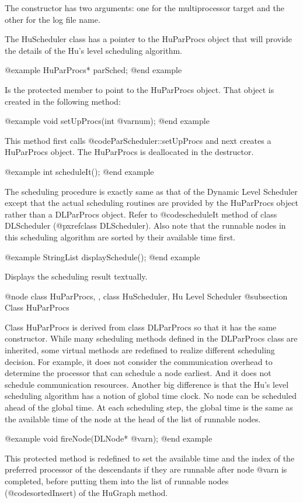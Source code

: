 The constructor has two arguments: one for the multiprocessor target and the
other for the log file name.

The HuScheduler class has a pointer to the HuParProcs object that will
provide the details of the Hu's level scheduling algorithm.

@example
HuParProcs* parSched;
@end example

Is the protected member to point to the HuParProcs object.
That object is created in the following method:

@example
void setUpProcs(int @var{num});
@end example

This method first calls @code{ParScheduler::setUpProcs} and next creates
a HuParProcs object. The HuParProcs is deallocated in the destructor.

@example
int scheduleIt();
@end example

The scheduling procedure is exactly same as that of the Dynamic Level 
Scheduler except that the actual scheduling routines are provided
by the HuParProcs object rather than a DLParProcs object. 
Refer to @code{scheduleIt} method of class DLScheduler
(@pxref{class DLScheduler}). Also note that the runnable nodes in
this scheduling algorithm are sorted by their available time first.

@example
StringList displaySchedule();
@end example

Displays the scheduling result textually.

@node class HuParProcs, , class HuScheduler, Hu Level Scheduler
@subsection Class HuParProcs

Class HuParProcs is derived from class DLParProcs so that it has the
same constructor. While many scheduling methods defined in the
DLParProcs class are inherited, some virtual methods are redefined to
realize different scheduling decision. For example, it does not
consider the communication overhead to determine the processor that can
schedule a node earliest. And it does not schedule communication resources.
Another big difference is that the Hu's level scheduling algorithm has
a notion of global time clock. No node can be scheduled ahead of the global
time. At each scheduling step, the global time is the same as the
available time of the node at the head of the list of runnable nodes.

@example
void fireNode(DLNode* @var{n});
@end example

This protected method is redefined to set the available time and the index
of the preferred processor of the descendants if they are runnable after node
@var{n} is completed, before putting them into the list of runnable nodes
(@code{sortedInsert}) of the HuGraph method.

